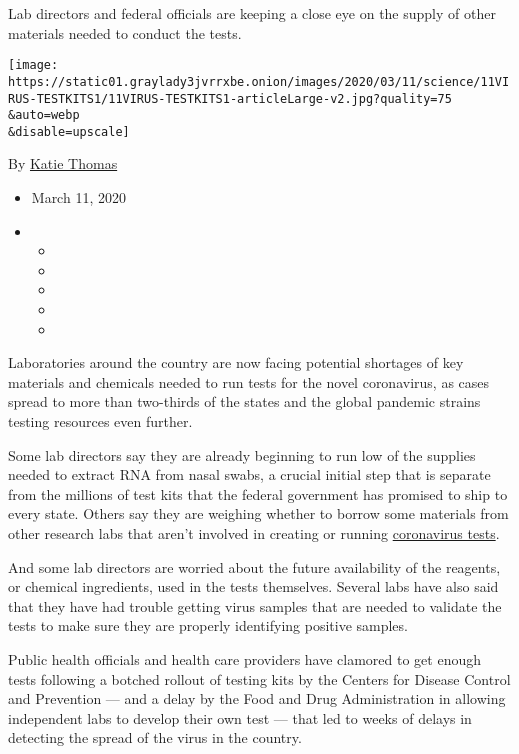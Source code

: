 Lab directors and federal officials are keeping a close eye on the
supply of other materials needed to conduct the tests.

\texttt{[image: https://static01.graylady3jvrrxbe.onion/images/2020/03/11/science/11VIRUS-TESTKITS1/11VIRUS-TESTKITS1-articleLarge-v2.jpg?quality=75\\\&auto=webp\\\&disable=upscale]}

By \href{https://www.nytimes3xbfgragh.onion/by/katie-thomas}{Katie
Thomas}

\begin{itemize}
\item
  March 11, 2020
\item
  \begin{itemize}
  \item
  \item
  \item
  \item
  \item
  \end{itemize}
\end{itemize}

Laboratories around the country are now facing potential shortages of
key materials and chemicals needed to run tests for the novel
coronavirus, as cases spread to more than two-thirds of the states and
the global pandemic strains testing resources even further.

Some lab directors say they are already beginning to run low of the
supplies needed to extract RNA from nasal swabs, a crucial initial step
that is separate from the millions of test kits that the federal
government has promised to ship to every state. Others say they are
weighing whether to borrow some materials from other research labs that
aren't involved in creating or running
\href{https://www.nytimes3xbfgragh.onion/2020/07/23/health/coronavirus-testing-supply-shortage.html}{coronavirus
tests}.

And some lab directors are worried about the future availability of the
reagents, or chemical ingredients, used in the tests themselves. Several
labs have also said that they have had trouble getting virus samples
that are needed to validate the tests to make sure they are properly
identifying positive samples.

Public health officials and health care providers have clamored to get
enough tests following a botched rollout of testing kits by the Centers
for Disease Control and Prevention --- and a delay by the Food and Drug
Administration in allowing independent labs to develop their own test
--- that led to weeks of delays in detecting the spread of the virus in
the country.


